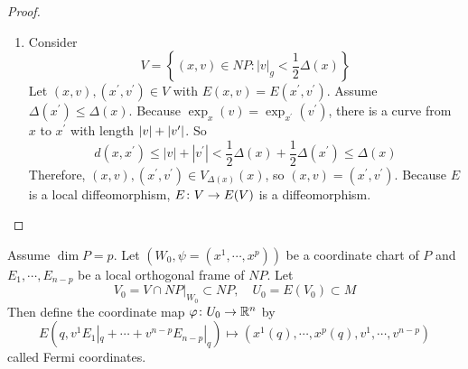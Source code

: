 \begin{enumerate}[label=\arabic{*}.]
\begin{proof}
\begin{enumerate}[label=(\roman*)]
		    \item Consider
		    \begin{equation*}
		        V=\left\{(x, v) \in N P:|v|_g<\frac{1}{2} \Delta(x)\right\}
		    \end{equation*}
		    Let $(x,v),(x^\prime,v^\prime) \in V$ with $E(x,v)= E(x^\prime,v^\prime)$. Assume $\Delta(x^\prime) \leq \Delta(x)$. Because $\exp_x(v) = \exp_{x^\prime}(v^\prime)$, there is a curve from $x$ to $x^\prime$ with length $\left\lvert v\right\lvert+\left\lvert v^\prime\right\lvert$. So
		    \begin{equation*}
		        d\left(x, x^{\prime}\right) \leq|v|+\left|v^{\prime}\right|<\frac{1}{2} \Delta(x)+\frac{1}{2} \Delta\left(x^{\prime}\right) \leq \Delta(x)
		    \end{equation*}
		    Therefore, $(x,v),(x^\prime,v^\prime) \in V_{\Delta(x)}(x)$, so $(x,v)=(x^\prime,v^\prime)$. Because $E$ is a local diffeomorphism, $E \colon V \rightarrow E(V)$ is a diffeomorphism. \qedhere
		\end{enumerate}
	\end{proof}
	Assume $\dim P = p$. Let $(W_0,\psi=(x^1,\cdots,x^p))$ be a coordinate chart of $P$ and $E_1,\cdots,E_{n-p}$ be a local orthogonal frame of $NP$. Let
	\begin{equation*}
	    V_0 = V \cap NP|_{W_0} \subset NP,\quad U_0 = E(V_0) \subset M
 	\end{equation*}
 	Then define the coordinate map $\varphi \colon U_0 \rightarrow \mathbb{R}^n$ by
 	\begin{equation*}
 	    E(q,v^1E_1|_q+\cdots +v^{n-p}E_{n-p}|_q) \mapsto (x^1(q),\cdots,x^p(q),v^1,\cdots,v^{n-p})
 	\end{equation*}
 	called Fermi coordinates.


\end{enumerate}
